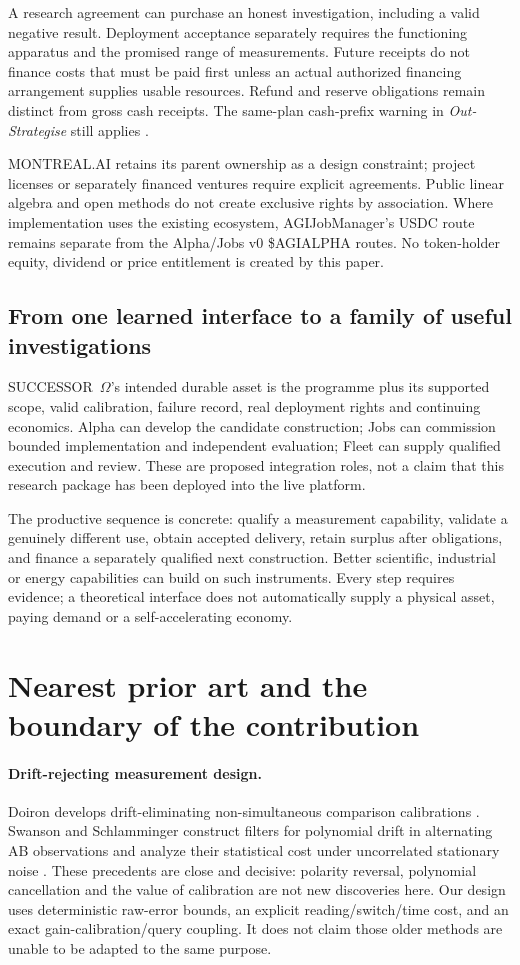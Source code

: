 \documentclass[11pt,letterpaper]{article}
\newcommand{\Om}{SUCCESSOR~$\Omega$}
\theoremstyle{definition}\newtheorem{definition}[theorem]{Definition}
\theoremstyle{remark}\newtheorem{remark}[theorem]{Remark}
\begin{document}
A research agreement can purchase an honest investigation, including a valid negative result. Deployment acceptance separately requires the functioning apparatus and the promised range of measurements. Future receipts do not finance costs that must be paid first unless an actual authorized financing arrangement supplies usable resources. Refund and reserve obligations remain distinct from gross cash receipts. The same-plan cash-prefix warning in \emph{Out-Strategise} still applies \cite{strategise}.

MONTREAL.AI retains its parent ownership as a design constraint; project licenses or separately financed ventures require explicit agreements. Public linear algebra and open methods do not create exclusive rights by association. Where implementation uses the existing ecosystem, AGIJobManager's USDC route remains separate from the Alpha/Jobs v0 \$AGIALPHA routes. No token-holder equity, dividend or price entitlement is created by this paper.

\subsection{From one learned interface to a family of useful investigations}
\Om's intended durable asset is the programme plus its supported scope, valid calibration, failure record, real deployment rights and continuing economics. Alpha can develop the candidate construction; Jobs can commission bounded implementation and independent evaluation; Fleet can supply qualified execution and review. These are proposed integration roles, not a claim that this research package has been deployed into the live platform.

The productive sequence is concrete: qualify a measurement capability, validate a genuinely different use, obtain accepted delivery, retain surplus after obligations, and finance a separately qualified next construction. Better scientific, industrial or energy capabilities can build on such instruments. Every step requires evidence; a theoretical interface does not automatically supply a physical asset, paying demand or a self-accelerating economy.

\section{Nearest prior art and the boundary of the contribution}
\label{sec:prior}
\paragraph{Drift-rejecting measurement design.}
Doiron develops drift-eliminating non-simultaneous comparison calibrations \cite{doiron}. Swanson and Schlamminger construct filters for polynomial drift in alternating AB observations and analyze their statistical cost under uncorrelated stationary noise \cite{swanson}. These precedents are close and decisive: polarity reversal, polynomial cancellation and the value of calibration are not new discoveries here. Our design uses deterministic raw-error bounds, an explicit reading/switch/time cost, and an exact gain-calibration/query coupling. It does not claim those older methods are unable to be adapted to the same purpose.
\end{document}
